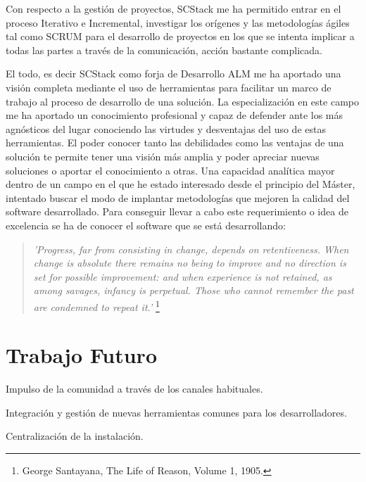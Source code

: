 \par Con respecto a la gestión de proyectos, SCStack me ha permitido entrar en el proceso Iterativo e Incremental, investigar los orígenes y las metodologías ágiles tal como SCRUM para el desarrollo de proyectos en los que se intenta implicar a todas las partes a través de la comunicación, acción bastante complicada.

\par El todo, es decir SCStack como forja de Desarrollo ALM me ha aportado una visión completa mediante el uso de herramientas para facilitar un marco de trabajo al proceso de desarrollo de una solución. La especialización en este campo me ha aportado un conocimiento profesional y capaz de defender ante los más agnósticos del lugar conociendo las virtudes y desventajas del uso de estas herramientas. El poder conocer tanto las debilidades como las ventajas de una solución te permite tener una visión más amplia y poder apreciar nuevas soluciones o aportar el conocimiento a otras. Una capacidad analítica mayor dentro de un campo en el que he estado interesado desde el principio del Máster, intentado buscar el modo de implantar metodologías que mejoren la calidad del software desarrollado. Para conseguir llevar a cabo este requerimiento o idea de excelencia se ha de conocer el software que se está desarrollando:

\begin{quote}
    \emph{'Progress, far from consisting in change, depends on retentiveness. When change is absolute there remains no being to improve and no direction is set for possible improvement: and when experience is not retained, as among savages, infancy is perpetual. Those who cannot remember the past are condemned to repeat it.'} \footnote{George Santayana, The Life of Reason, Volume 1, 1905.}
\end{quote}

\section{Trabajo Futuro}
\label{sec:trabajofuturo}

\par Impulso de la comunidad a trav\'es de los canales habituales.

\par Integraci\'on y gesti\'on de nuevas herramientas comunes para los desarrolladores.

\par Centralizaci\'on de la instalaci\'on.

